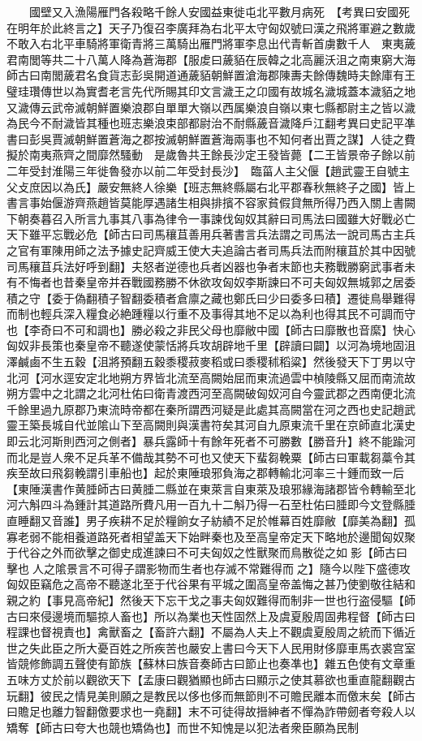 　　國壁又入漁陽雁門各殺略千餘人安國益東徙屯北平數月病死　【考異曰安國死在明年於此終言之】天子乃復召李廣拜為右北平太守匈奴號曰漢之飛將軍避之數歲不敢入右北平車騎將軍衛青將三萬騎出雁門將軍李息出代青斬首虜數千人　東夷薉君南閭等共二十八萬人降為蒼海郡【服䖍曰薉貊在辰韓之北高麗沃沮之南東窮大海師古曰南閭薉君名食貨志彭吳開道通薉貊朝鮮置滄海郡陳夀夫餘傳魏時夫餘庫有王璧珪瓚傳世以為實耆老言先代所賜其印文言濊王之卬國有故城名濊城蓋本濊貊之地又濊傳云武帝滅朝鮮置樂浪郡自單單大嶺以西属樂浪自嶺以東七縣都尉主之皆以濊為民今不耐濊皆其種也班志樂浪束部都尉治不耐縣薉音濊降戶江翻考異曰史記平凖書曰彭吳賈滅朝鮮置蒼海之郡按滅朝鮮置蒼海兩事也不知何者出賈之謀】人徒之費擬於南夷燕齊之間靡然騷動　是歲魯共王餘長沙定王發皆薨【二王皆景帝子餘以前二年受封淮陽三年徙魯發亦以前二年受封長沙】　臨菑人主父偃【趙武靈王自號主父攴庶因以為氏】嚴安無終人徐樂【班志無終縣屬右北平郡春秋無終子之國】皆上書言事始偃游齊燕趙皆莫能厚遇諸生相與排擯不容家貧假貸無所得乃西入關上書闕下朝奏暮召入所言九事其八事為律令一事諫伐匈奴其辭曰司馬法曰國雖大好戰必亡天下雖平忘戰必危【師古曰司馬穰苴善用兵著書言兵法謂之司馬法一說司馬古主兵之官有軍陳用師之法予據史記齊威王使大夫追論古者司馬兵法而附穰苴於其中因號司馬穰苴兵法好呼到翻】夫怒者逆德也兵者凶器也争者末節也夫務戰勝窮武事者未有不悔者也昔秦皇帝并吞戰國務勝不休欲攻匈奴李斯諫曰不可夫匈奴無城郭之居委積之守【委于偽翻積子智翻委積者倉廪之藏也鄭氏曰少曰委多曰積】遷徙鳥舉難得而制也輕兵深入糧食必絶踵糧以行重不及事得其地不足以為利也得其民不可調而守也【李奇曰不可和調也】勝必殺之非民父母也靡敝中國【師古曰靡散也音縻】快心匈奴非長策也秦皇帝不聽遂使蒙恬將兵攻胡辟地千里【辟讀曰闢】以河為境地固沮澤鹹鹵不生五穀【沮將預翻五穀黍稷菽麥稻或曰黍稷秫稻粱】然後發天下丁男以守北河【河水逕安定北地朔方界皆北流至高闕始屈而東流過雲中楨陵縣又屈而南流故朔方雲中之北謂之北河杜佑曰衛青渡西河至高闕破匈奴河自今靈武郡之西南便北流千餘里過九原郡乃東流時帝都在秦所謂西河疑是此處其高闕當在河之西也史記趙武靈王築長城自代並隂山下至高闕則與漢書符矣其河自九原東流千里在京師直北漢史即云北河斯則西河之側者】暴兵露師十有餘年死者不可勝數【勝音升】終不能踰河而北是豈人衆不足兵革不備哉其勢不可也又使天下蜚芻輓粟【師古曰軍載芻藁令其疾至故曰飛芻輓謂引車船也】起於東陲琅邪負海之郡轉輸北河率三十鍾而致一后【東陲漢書作黄腄師古曰黄腄二縣並在東萊言自東萊及琅邪緣海諸郡皆令轉輸至北河六斛四斗為鍾計其道路所費凡用一百九十二斛乃得一石至杜佑曰腄即今文登縣腄直睡翻又音誰】男子疾耕不足於糧餉女子紡績不足於帷幕百姓靡敝【靡美為翻】孤寡老弱不能相養道路死者相望盖天下始畔秦也及至高皇帝定天下略地於邊聞匈奴聚于代谷之外而欲擊之御史成進諫曰不可夫匈奴之性獸聚而鳥散從之如影【師古曰擊也人之隂景言不可得子謂影物而生者也存滅不常難得而之】隨今以陛下盛德攻匈奴臣竊危之高帝不聽遂北至于代谷果有平城之圍高皇帝盖悔之甚乃使劉敬往結和親之約【事見高帝紀】然後天下忘干戈之事夫匈奴難得而制非一世也行盗侵驅【師古曰來侵邊境而驅掠人畜也】所以為業也天性固然上及虞夏殷周固弗程督【師古曰程課也督視責也】禽獸畜之【畜許六翻】不屬為人夫上不觀虞夏殷周之統而下循近世之失此臣之所大憂百姓之所疾苦也嚴安上書曰今天下人民用財侈靡車馬衣裘宫室皆競修飾調五聲使有節族【蘇林曰族音奏師古曰節止也奏凖也】雜五色使有文章重五味方丈於前以觀欲天下【孟康曰觀猶顯也師古曰顯示之使其慕欲也重直龍翻觀古玩翻】彼民之情見美則願之是教民以侈也侈而無節則不可贍民離本而儌末矣【師古曰贍足也離力智翻儌要求也一堯翻】末不可徒得故搢紳者不憚為詐帶劒者夸殺人以矯奪【師古曰夸大也競也矯偽也】而世不知愧是以犯法者衆臣願為民制